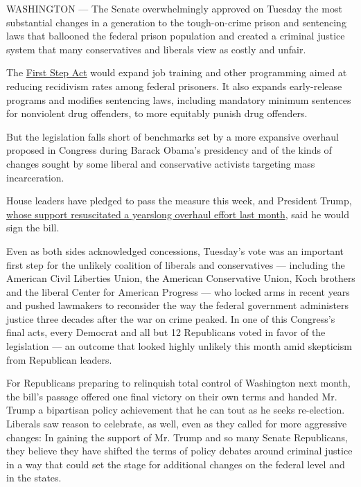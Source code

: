 WASHINGTON --- The Senate overwhelmingly approved on Tuesday the most
substantial changes in a generation to the tough-on-crime prison and
sentencing laws that ballooned the federal prison population and created
a criminal justice system that many conservatives and liberals view as
costly and unfair.

The
\href{https://www.judiciary.senate.gov/download/revised-first-step-act-of-2018}{First
Step Act} would expand job training and other programming aimed at
reducing recidivism rates among federal prisoners. It also expands
early-release programs and modifies sentencing laws, including mandatory
minimum sentences for nonviolent drug offenders, to more equitably
punish drug offenders.

But the legislation falls short of benchmarks set by a more expansive
overhaul proposed in Congress during Barack Obama's presidency and of
the kinds of changes sought by some liberal and conservative activists
targeting mass incarceration.

House leaders have pledged to pass the measure this week, and President
Trump,
\href{https://www.nytimes.com/2018/11/14/us/politics/prison-sentencing-trump.html}{whose
support resuscitated a yearslong overhaul effort last month}, said he
would sign the bill.

Even as both sides acknowledged concessions, Tuesday's vote was an
important first step for the unlikely coalition of liberals and
conservatives --- including the American Civil Liberties Union, the
American Conservative Union, Koch brothers and the liberal Center for
American Progress --- who locked arms in recent years and pushed
lawmakers to reconsider the way the federal government administers
justice three decades after the war on crime peaked. In one of this
Congress's final acts, every Democrat and all but 12 Republicans voted
in favor of the legislation --- an outcome that looked highly unlikely
this month amid skepticism from Republican leaders.

For Republicans preparing to relinquish total control of Washington next
month, the bill's passage offered one final victory on their own terms
and handed Mr. Trump a bipartisan policy achievement that he can tout as
he seeks re-election. Liberals saw reason to celebrate, as well, even as
they called for more aggressive changes: In gaining the support of Mr.
Trump and so many Senate Republicans, they believe they have shifted the
terms of policy debates around criminal justice in a way that could set
the stage for additional changes on the federal level and in the states.

